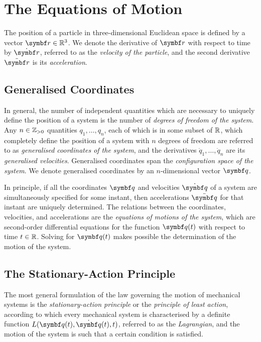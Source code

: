 



\section{The Equations of Motion}

The position of a particle in three-dimensional Euclidean space is defined by a vector \(\vct{r} \in \setreal^3\). We
denote the derivative of \(\vct{r}\) with respect to time by \(\dot{\vct{r}}\), referred to as the \emph{velocity of the
particle}, and the second derivative \(\ddot{\vct{r}}\) is its \emph{acceleration}.

\subsection{Generalised Coordinates}

In general, the number of independent quantities which are necessary to uniquely define the position of a system is the
number of \emph{degrees of freedom of the system}. Any \(n \in \mathbb{Z}_{>0}\) quantities \(q_1, \ldots, q_n\), each of which
is in some subset of \(\mathbb{R}\), which completely define the position of a system with \(n\) degrees of freedom are
referred to as \emph{generalised coordinates of the system}, and the derivatives \(\dot{q}_1, \ldots, \dot{q}_n\) are
its \emph{generalised velocities}. Generalised coordinates span the \emph{configuration space of the system}. We denote
generalised coordinates by an \(n\)-dimensional vector \(\vct{q}\).

In principle, if all the coordinates \(\vct{q}\) and velocities \(\dot{\vct{q}}\) of a system are simultaneously
specified for some instant, then accelerations \(\ddot{\vct{q}}\) for that instant are uniquely determined. The
relations between the coordinates, velocities, and accelerations are the \emph{equations of motions of the system},
which are second-order differential equations for the function \(\vct{q}(t)\) with respect to time \(t \in \mathbb{R}\).
Solving for \(\vct{q}(t)\) makes possible the determination of the motion of the system.

\subsection{The Stationary-Action Principle}

The most general formulation of the law governing the motion of mechanical systems is the \emph{stationary-action
principle} or the \emph{principle of least action}, according to which every mechanical system is characterised by a
definite function \(L(\vct{q}(t), \dot{\vct{q}}(t), t)\), referred to as the \emph{Lagrangian}, and the motion of the
system is such that a certain condition is satisfied.

